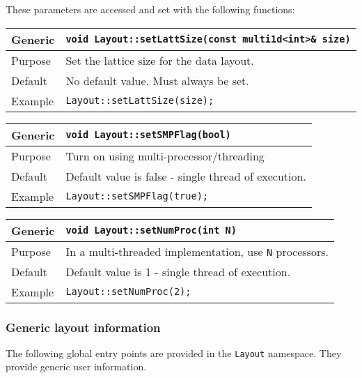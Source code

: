 \documentclass[12pt,letterpaper]{article}
\begin{document}
These parameters are accessed and set with the following functions:
\begin{flushleft}
  \begin{tabular}{|l|l|}
  \hline
  Generic      & \verb|void Layout::setLattSize(const multi1d<int>& size)|\\
  \hline
  Purpose      & Set the lattice size for the data layout. \\
  \hline
  Default      & No default value. Must always be set. \\
\hline
  Example  & \verb|Layout::setLattSize(size);| \\
   \hline
 \end{tabular}
\end{flushleft}

\begin{flushleft}
  \begin{tabular}{|l|l|}
  \hline
  Generic      & \verb|void Layout::setSMPFlag(bool)|\\
  \hline
  Purpose      & Turn on using multi-processor/threading \\
  \hline
  Default      & Default value is false - single thread of execution. \\
  \hline
  Example  & \verb|Layout::setSMPFlag(true);| \\
   \hline
 \end{tabular}
\end{flushleft}

\begin{flushleft}
  \begin{tabular}{|l|l|}
  \hline
  Generic      & \verb|void Layout::setNumProc(int N)|\\
  \hline
  Purpose      & In a multi-threaded implementation, use \verb|N| processors. \\
  \hline
  Default      & Default value is 1 - single thread of execution. \\
  \hline
  Example  & \verb|Layout::setNumProc(2);| \\
   \hline
 \end{tabular}
\end{flushleft}

\subsubsection{Generic layout information}
        
The following global entry points are provided in the \verb|Layout| namespace.
They provide generic user information.
\end{document}
